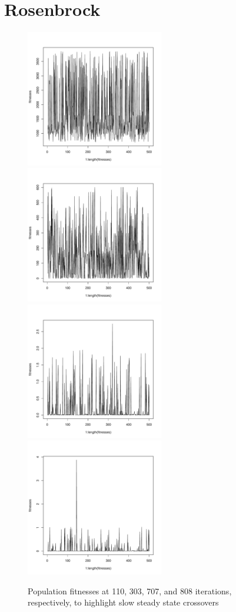 \documentclass[12pt]{article}
\begin{document}
\section{Rosenbrock}
\begin{figure}[!h]
        \begin{center}
		\includegraphics[width=60mm]{images/rosenbrock.ss/ind_110.pdf}
		\includegraphics[width=60mm]{images/rosenbrock.ss/ind_303.pdf}
		\includegraphics[width=60mm]{images/rosenbrock.ss/ind_707.pdf}
		\includegraphics[width=60mm]{images/rosenbrock.ss/ind_808.pdf}
               	\caption{Population fitnesses at 110, 303, 707, and 808 iterations, respectively, to highlight slow steady state crossovers}
                \label{rosenbrock_ss_pop_fit}
        \end{center}
\end{figure}
\end{document}

